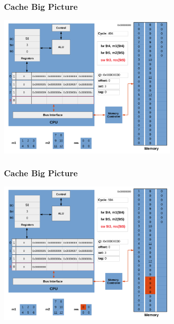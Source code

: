 \documentclass{beamer}
\begin{document}
\begin{frame}[fragile]
\frametitle{Cache Big Picture}

\begin{center}
\vspace*{-0.23cm}
\hspace*{-1cm}\includegraphics[width=9cm]{cache37.pdf}
\end{center}

\end{frame}

\begin{frame}[fragile]
\frametitle{Cache Big Picture}

\begin{center}
\vspace*{-0.23cm}
\hspace*{-1cm}\includegraphics[width=9cm]{cache38.pdf}
\end{center}

\end{frame}
\end{document}
